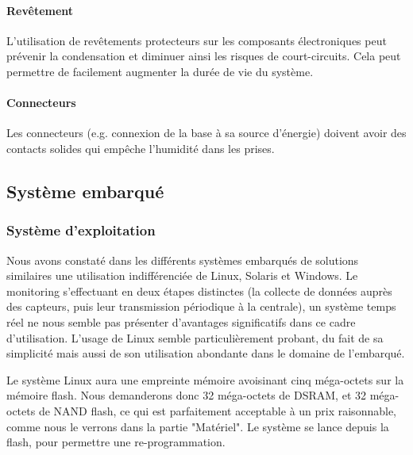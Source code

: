 \paragraph{Revêtement}

L'utilisation de revêtements protecteurs sur les composants électroniques peut prévenir la condensation et diminuer ainsi les risques de court-circuits. Cela peut permettre de facilement augmenter la durée de vie du système.

\paragraph{Connecteurs}

Les connecteurs (e.g. connexion de la base à sa source d'énergie) doivent avoir des contacts solides qui empêche l'humidité dans les prises.

\subsection{Système embarqué}

\subsubsection{Système d'exploitation}

Nous avons constaté dans les différents systèmes embarqués de solutions similaires une utilisation indifférenciée de Linux, Solaris et Windows\footnotemark. Le monitoring s'effectuant en deux étapes distinctes (la collecte de données auprès des capteurs, puis leur transmission périodique à la centrale), un système temps réel ne nous semble pas présenter d'avantages significatifs dans ce cadre d'utilisation. L'usage de Linux semble particulièrement probant, du fait de sa simplicité mais aussi de son utilisation abondante dans le domaine de l'embarqué.


Le système Linux aura une empreinte mémoire avoisinant cinq méga-octets sur la mémoire flash\footnotemark. Nous demanderons donc 32 méga-octets de DSRAM, et 32 méga-octets de NAND flash, ce qui est parfaitement acceptable à un prix raisonnable, comme nous le verrons dans la partie "Matériel". Le système se lance depuis la flash, pour permettre une re-programmation.


